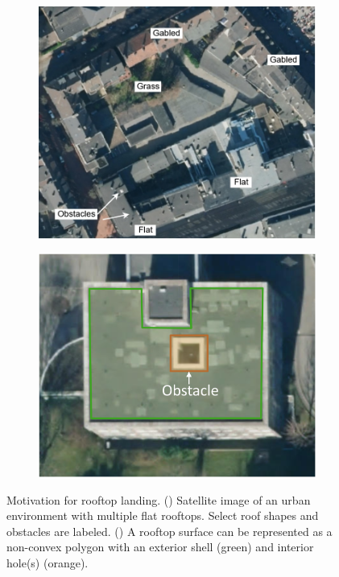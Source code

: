 \begin{figure}[!h]
    \centering
  \begin{subfigure}{.40\linewidth}
    \centering
    \includegraphics[clip, trim=0.0cm 0cm 0cm 0.55cm, width=0.95\linewidth]{chapter_5_mapping/imgs/challenge_urban-Page-2.jpg}
    \caption{}
    \label{fig:ch1_challenge_urban}
  \end{subfigure}
  \begin{subfigure}{.40\linewidth}
    \centering\includegraphics[width=.95\linewidth]{chapter_1_intro/imgs/roof_shape_obstacle.pdf}
    \caption{}
    \label{fig:ch1_roof_shape_obstacle}
  \end{subfigure}
  \caption[Motivation for rooftop landing]{Motivation for rooftop landing. () Satellite image of an urban environment with multiple flat rooftops. Select roof shapes and obstacles are labeled.  () A rooftop surface can be represented as a non-convex polygon with an exterior shell (green) and interior hole(s) (orange).  }\label{fig:ch1_motivation}
\end{figure}


